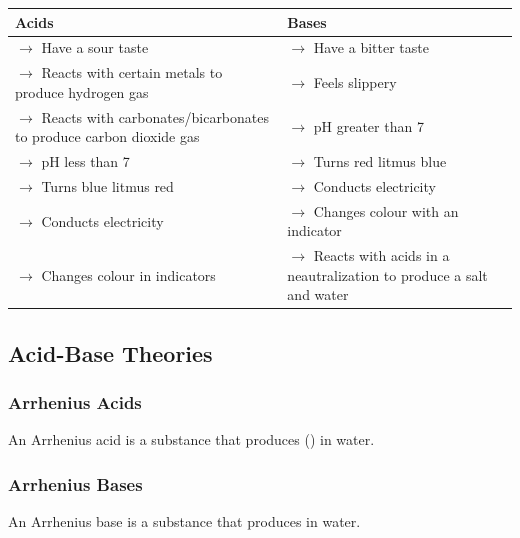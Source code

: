 \documentclass[11pt]{article}
\begin{document}
    \begin{center}
        \begin{tabular}{ | p{5cm} | p{5cm} | }
            \hline
            Acids & Bases \\ \hline
            $\rightarrow$ Have a sour taste & $\rightarrow$ Have a bitter taste \\
            $\rightarrow$ Reacts with certain metals to produce hydrogen gas & $\rightarrow$ Feels slippery \\
            $\rightarrow$ Reacts with carbonates/bicarbonates to produce carbon dioxide gas & $\rightarrow$ pH greater than 7 \\
            $\rightarrow$ pH less than 7 & $\rightarrow$ Turns red litmus blue \\
            $\rightarrow$ Turns blue litmus red & $\rightarrow$ Conducts electricity \\
            $\rightarrow$ Conducts electricity & $\rightarrow$ Changes colour with an indicator \\
            $\rightarrow$ Changes colour in indicators & $\rightarrow$ Reacts with acids in a neautralization to produce a salt and water \\ \hline
        \end{tabular}
    \end{center}

    \subsection{Acid-Base Theories}
    \subsubsection{Arrhenius Acids}
    An Arrhenius acid is a substance that produces  () in water.

    \begin{center}
    \end{center}

    \subsubsection{Arrhenius Bases}
    An Arrhenius base is a substance that produces  in water.

    \begin{center}
    \end{center}
\end{document}
